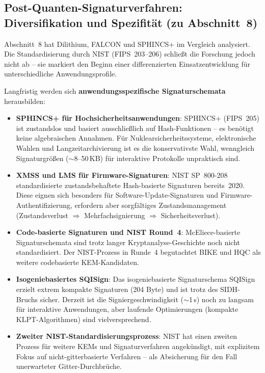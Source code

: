 ﻿\documentclass[a4paper,12pt]{article}
\theoremstyle{definition}
\begin{document}
\subsection{Post-Quanten-Signaturverfahren: Diversifikation und Spezifität (zu Abschnitt~8)}

Abschnitt~8 hat Dilithium, FALCON und SPHINCS+ im Vergleich analysiert.
Die Standardisierung durch NIST (FIPS~203--206) schließt die Forschung
jedoch nicht ab -- sie markiert den Beginn einer differenzierten
Einsatzentwicklung für unterschiedliche Anwendungsprofile.

Langfristig werden sich \textbf{anwendungsspezifische
Signaturschemata} herausbilden:
\begin{itemize}
  \item \textbf{SPHINCS+ für Hochsicherheitsanwendungen}:
    SPHINCS+ (FIPS~205) ist zustandslos und basiert ausschließlich
    auf Hash-Funktionen -- es benötigt keine algebraischen Annahmen.
    Für Nuklearsicherheitssysteme, elektronische Wahlen und
    Langzeitarchivierung ist es die konservativste Wahl, wenngleich
    Signaturgrößen ($\sim$8--50\,KB) für interaktive Protokolle
    unpraktisch sind.
  \item \textbf{XMSS und LMS für Firmware-Signaturen}:
    NIST SP~800-208 standardisierte zustandsbehaftete
    Hash-basierte Signaturen bereits~2020. Diese eignen sich
    besonders für Software-Update-Signaturen und Firmware-Authentifizierung,
    erfordern aber sorgfältiges Zustandsmanagement (Zustandsverlust
    $\Rightarrow$ Mehrfachsignierung $\Rightarrow$ Sicherheitsverlust).
  \item \textbf{Code-basierte Signaturen und NIST Round~4}:
    McEliece-basierte Signaturschemata sind trotz langer
    Kryptanalyse-Geschichte noch nicht standardisiert.
    Der NIST-Prozess in Runde~4 begutachtet BIKE und HQC
    als weitere codebasierte KEM-Kandidaten.
  \item \textbf{Isogeniebasiertes SQISign}: Das isogeniebasierte
    Signaturschema SQISign erzielt extrem kompakte Signaturen
    (204 Byte) und ist trotz des SIDH-Bruchs sicher.
    Derzeit ist die Signiergeschwindigkeit ($\sim$1\,s) noch
    zu langsam für interaktive Anwendungen, aber laufende
    Optimierungen (kompakte KLPT-Algorithmen) sind vielversprechend.
  \item \textbf{Zweiter NIST-Standardisierungsprozess}:
    NIST hat einen zweiten Prozess für weitere KEMs und
    Signaturverfahren angekündigt, mit explizitem Fokus
    auf nicht-gitterbasierte Verfahren -- als Absicherung
    für den Fall unerwarteter Gitter-Durchbrüche.
\end{itemize}
\end{document}
